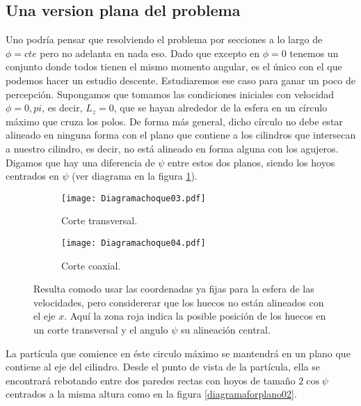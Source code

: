 \documentclass[letterpaper,12pt]{article}
\begin{document}
\subsection{Una version plana del problema}

Uno podría pensar que resolviendo el problema por secciones 
a lo largo de $\phi= cte$ pero no adelanta en nada eso. Dado
que excepto en $\phi=0$ tenemos un conjunto donde todos
tienen el mismo momento angular, es el único con el que podemos
hacer un estudio descente. Estudiaremos ese caso
para ganar un poco de percepción. Supongamos que tomamos las condiciones
iniciales con velocidad $\phi=0,pi$, es decir, $L_z=0$, que se hayan
alrededor de la esfera en un círculo máximo que cruza los polos. 
De forma más general, dicho círculo no debe estar alineado
en ninguna forma con el plano  que contiene a los cilindros 
que intersecan a nuestro cilindro, es decir, no está alineado en 
forma alguna con los agujeros. Digamos que hay una diferencia
de $\psi$ entre estos dos planos, siendo los hoyos centrados
en $\psi$ (ver diagrama en la figura \ref{diagramaforplano01}).

 
\begin{figure}[ht]
\centering
\begin{subfigure}[c]{0.6\textwidth}
  \centering
  \texttt{[image: Diagramachoque03.pdf]}
  \caption{Corte transversal.}
\end{subfigure}
\begin{subfigure}[c]{0.32\textwidth}
  \centering
  \texttt{[image: Diagramachoque04.pdf]}
  \caption{Corte coaxial.}
\end{subfigure}
\caption{Resulta comodo usar las coordenadas ya fijas
para la esfera de las velocidades, pero considererar que
los huecos no están alineados con el eje $x$. Aquí la
zona roja indica la posible posición de los huecos en un
corte transversal y el angulo $\psi$ su alineación central. }
\label{diagramaforplano01}
\end{figure}

La partícula que comience en éste circulo máximo se mantendrá
en un plano que contiene al eje del cilindro. 
Desde el punto de vista de la partícula, ella se encontrará
rebotando entre dos paredes rectas con hoyos de tamaño
$2\cos\psi$ centrados a la misma altura como
en la figura \ref{diagramaforplano02}.
\end{document}

